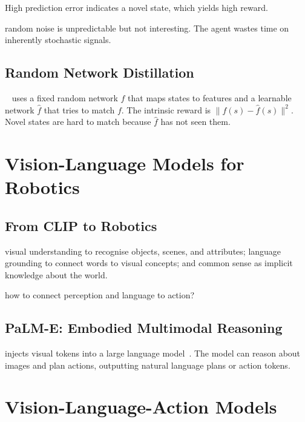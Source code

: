 High prediction error indicates a novel state, which yields high reward.

 random noise is unpredictable but not interesting. The agent wastes time on inherently stochastic signals.

\subsection{Random Network Distillation}

~\cite{Burda2019RND} uses a fixed random network $f$ that maps states to features and a learnable network $\hat{f}$ that tries to match $f$. The intrinsic reward is $\|f(s) - \hat{f}(s)\|^2$. Novel states are hard to match because $\hat{f}$ has not seen them.


\section{Vision-Language Models for Robotics}


\subsection{From CLIP to Robotics}

 visual understanding to recognise objects, scenes, and attributes; language grounding to connect words to visual concepts; and common sense as implicit knowledge about the world.

 how to connect perception and language to action?

\subsection{PaLM-E: Embodied Multimodal Reasoning}

 injects visual tokens into a large language model~\cite{Driess2023PaLME}. The model can reason about images and plan actions, outputting natural language plans or action tokens.


\section{Vision-Language-Action Models}

